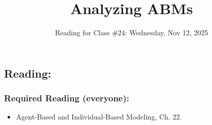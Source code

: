 \documentclass[
]{article}
\title{Analyzing ABMs}
\author{}
\date{\vspace{-2.5em}Reading for Class \#24: Wednesday, Nov 12, 2025}
\providecommand{\tightlist}{%
  \setlength{\itemsep}{0pt}\setlength{\parskip}{0pt}}
\begin{document}
\maketitle

{
\setcounter{tocdepth}{2}
\tableofcontents
}
\subsection{Reading:}\label{reading}

\subsubsection{Required Reading
(everyone):}\label{required-reading-everyone}

\begin{itemize}
\tightlist
\item
  Agent-Based and Individual-Based Modeling, Ch. 22.
\end{itemize}
\end{document}
